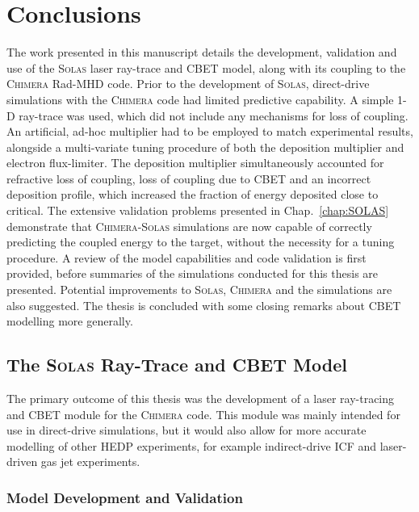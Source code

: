 \chapter{Conclusions}%
\label{chap:conclusions}
\acresetall

The work presented in this manuscript details the development, validation and use of the \textsc{Solas} laser ray-trace and \ac{CBET} model, along with its coupling to the \textsc{Chimera} \ac{Rad-MHD} code.
Prior to the development of \textsc{Solas}, direct-drive simulations with the \textsc{Chimera} code had limited predictive capability.
A simple 1-D ray-trace was used, which did not include any mechanisms for loss of coupling.
An artificial, ad-hoc multiplier had to be employed to match experimental results, alongside a multi-variate tuning procedure of both the deposition multiplier and electron flux-limiter.
The deposition multiplier simultaneously accounted for refractive loss of coupling, loss of coupling due to \ac{CBET} and an incorrect deposition profile, which increased the fraction of energy deposited close to critical.
The extensive validation problems presented in Chap.~\ref{chap:SOLAS} demonstrate that \textsc{Chimera}-\textsc{Solas} simulations are now capable of correctly predicting the coupled energy to the target, without the necessity for a tuning procedure.
A review of the model capabilities and code validation is first provided, before summaries of the simulations conducted for this thesis are presented.
Potential improvements to \textsc{Solas}, \textsc{Chimera} and the simulations are also suggested.
The thesis is concluded with some closing remarks about \ac{CBET} modelling more generally.

\newpage

\section{The \textsc{Solas} Ray-Trace and CBET Model}

The primary outcome of this thesis was the development of a laser ray-tracing and \ac{CBET} module for the \textsc{Chimera} code.
This module was mainly intended for use in direct-drive simulations, but it would also allow for more accurate modelling of other \ac{HEDP} experiments, for example indirect-drive \ac{ICF} and laser-driven gas jet experiments.

\subsection{Model Development and Validation}

